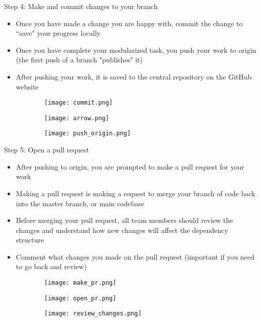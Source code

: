 \documentclass{beamer}
\begin{document}
\begin{frame}{Step 4: Make and commit changes to your branch}
\begin{itemize}
    \item Once you have made a change you are happy with, commit the change to ``save" your progress locally
    \item Once you have complete your modularized task, you push your work to origin (the first push of a branch "publishes" it)
    \item After pushing your work, it is saved to the central repository on the GitHub website
\end{itemize}
\begin{figure}
\centering
\begin{subfigure}{\textwidth}
  \centering
  \texttt{[image: commit.png]}
\end{subfigure}%
\begin{subfigure}{\textwidth}
  \centering
  \texttt{[image: arrow.png]}
\end{subfigure}
\begin{subfigure}{\textwidth}
  \centering
  \texttt{[image: push\_origin.png]}
\end{subfigure}
\end{figure}
\end{frame}

\begin{frame}{Step 5: Open a pull request}
\begin{itemize}
    \item After pushing to origin, you are prompted to make a pull request for your work
    \item Making a pull request is making a request to merge your branch of code back into the master branch, or main codebase
    \item Before merging your pull request, all team members should review the changes and understand how new changes will affect the dependency structure
    \item Comment what changes you made on the pull request (important if you need to go back and review)
\end{itemize}
\begin{figure}
\centering
\begin{subfigure}{\textwidth}
  \centering
  \texttt{[image: make\_pr.png]}
\end{subfigure}%
\begin{subfigure}{\textwidth}
  \centering
  \texttt{[image: open\_pr.png]}
\end{subfigure}
\begin{subfigure}{\textwidth}
  \centering
  \texttt{[image: review\_changes.png]}
\end{subfigure}
\end{figure}
\end{frame}
\end{document}
